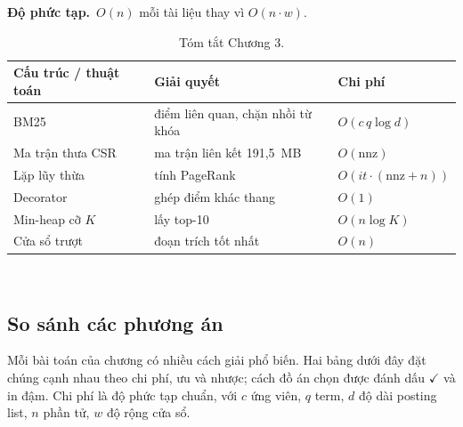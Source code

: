 \documentclass[9pt,twocolumn,a4paper]{extarticle}
\newcommand{\dpt}{\textcolor{linkblue}{\textbf{Độ phức tạp.}}~}
\begin{document}
\dpt $O(n)$ mỗi tài liệu thay vì $O(n\cdot w)$.

\begin{table}[H]
\centering
\caption{Tóm tắt Chương 3.}
\label{tab:c3}
\footnotesize
\begin{tabular}{@{}p{2.0cm}p{3.2cm}l@{}}
\toprule
Cấu trúc / thuật toán & Giải quyết & Chi phí \\
\midrule
BM25 & điểm liên quan, chặn nhồi từ khóa & $O(c\,q\log d)$ \\
Ma trận thưa CSR & ma trận liên kết 191,5~MB & $O(\text{nnz})$ \\
Lặp lũy thừa & tính PageRank & $O(it\cdot(\text{nnz}{+}n))$ \\
Decorator & ghép điểm khác thang & $O(1)$ \\
Min-heap cỡ $K$ & lấy top-10 & $O(n\log K)$ \\
Cửa sổ trượt & đoạn trích tốt nhất & $O(n)$ \\
\bottomrule
\end{tabular}
\end{table}

﻿\subsection*{So sánh các phương án}
Mỗi bài toán của chương có nhiều cách giải phổ biến. Hai bảng dưới đây đặt chúng cạnh nhau theo chi phí, ưu và nhược; cách đồ án chọn được đánh dấu $\checkmark$ và in đậm. Chi phí là độ phức tạp chuẩn, với $c$ ứng viên, $q$ term, $d$ độ dài posting list, $n$ phần tử, $w$ độ rộng cửa sổ.
\end{document}
